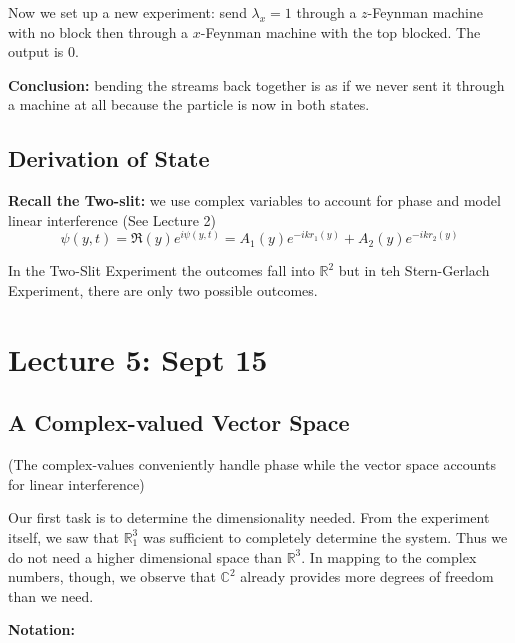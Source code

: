 \documentclass[12pt]{article}
\newcommand{\R}{\mathbb{R}}
\begin{document}
Now we set up a new experiment: send $\lambda_x = 1$ through a $z$-Feynman machine with no block then through a $x$-Feynman machine with the top blocked. The output is $0$.

\textbf{Conclusion:} bending the streams back together is as if we never sent it through a machine at all because the particle is now in both states. 

\subsection*{Derivation of State}
\textbf{Recall the Two-slit:} we use complex variables to account for phase and model linear interference (See Lecture 2)
\[\psi(y, t) = \Re(y)e^{i\psi(y, t)} = A_1(y) e^{-ikr_1(y)} + A_2(y)e^{-ikr_2(y)}\]

In the Two-Slit Experiment the outcomes fall into $\R^2$ but in teh Stern-Gerlach Experiment, there are only two possible outcomes. 

\section*{Lecture 5: Sept 15}
\subsection*{A Complex-valued Vector Space}
(The complex-values conveniently handle phase while the vector space accounts for linear interference)

Our first task is to determine the dimensionality needed. From the experiment itself, we saw that $\R_1^3$ was sufficient to completely determine the system. Thus we do not need a higher dimensional space than $\R^3$. In mapping to the complex numbers, though, we observe that $\mathbb{C}^2$ already provides more degrees of freedom than we need. 

\textbf{Notation:}

\begin{center}
\end{center}
\end{document}
